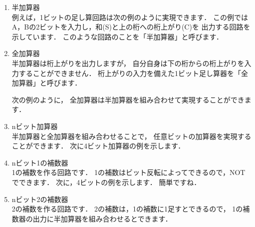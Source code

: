 \begin{enumerate}
\item 半加算器 \\
例えば，1ビットの足し算回路は次の例のように実現できます．
この例では A，Bの2ビットを入力し，和(S)と上の桁への桁上がり(C)を
出力する回路を示しています．
このような回路のことを「半加算器」と呼びます．

\vspace{0.2cm}

\item 全加算器 \\
半加算器は桁上がりを出力しますが，
自分自身は下の桁からの桁上がりを入力することができません．
桁上がりの入力を備えた1ビット足し算器を「全加算器」と呼びます．

次の例のように，
全加算器は半加算器を組み合わせて実現することができます．

\vspace{0.2cm}

\item nビット加算器 \\
半加算器と全加算器を組み合わせることで，
任意ビットの加算器を実現することができます．
次に4ビット加算器の例を示します．

\vspace{0.2cm}

\pagebreak
\item nビット1の補数器 \\
1の補数を作る回路です．
1の補数はビット反転によってできるので，NOTでできます．
次に，4ビットの例を示します．
簡単ですね．

\vspace{0.2cm}

\item nビット2の補数器 \\
2の補数を作る回路です．
2の補数は，1の補数に1足すとできるので，
1の補数器の出力に半加算器を組み合わせるとできます．

\vspace{0.2cm}

\end{enumerate}


